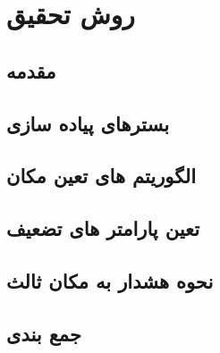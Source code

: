\chapter{روش تحقیق}

	\section{مقدمه}
	

	\section{بسترهای پیاده سازی}
	

	\section{الگوریتم های تعین مکان}

	\section{تعین پارامتر های تضعیف}

	\section{نحوه هشدار به مکان ثالث}

	\section{جمع بندی}
